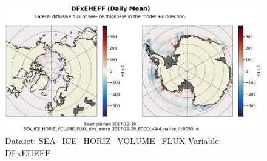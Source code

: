 \begin{figure}[H]
\centering
\includegraphics[width=\textwidth]{../images/plots/native_plots/Sea-Ice_and_Snow_Horizontal_Volume_Fluxes/DFxEHEFF.png}
\caption{Dataset: SEA\_ICE\_HORIZ\_VOLUME\_FLUX Variable: DFxEHEFF}
\label{tab:table-SEA_ICE_HORIZ_VOLUME_FLUX_DFxEHEFF-Plot}
\end{figure}
\pagebreak

